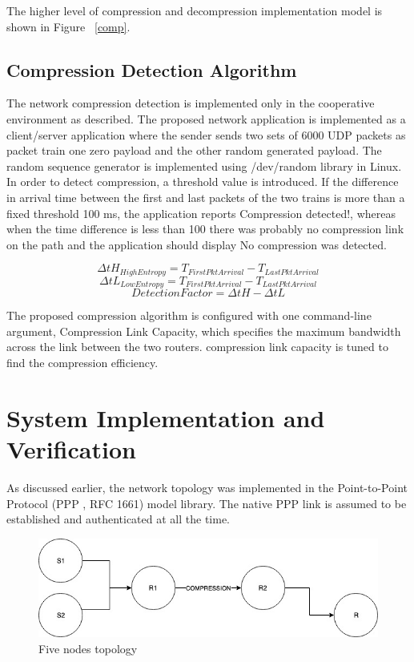 \documentclass[sigconf]{acmart}
\begin{document}
The higher level of compression and decompression implementation model is shown in Figure ~\ref{comp}.
\subsection{Compression Detection Algorithm}
The network compression detection is implemented only in the cooperative environment as described. The proposed network application is implemented as a client/server application where the sender sends two sets of 6000 UDP packets as packet train one zero payload and the other random generated payload. The random sequence generator is implemented using /dev/random library in Linux. In order to detect compression, a threshold value is introduced. If the difference in arrival time between the first and last packets of the two trains is more than a fixed threshold 100 ms, the application reports Compression detected!, whereas when the time difference is less than 100 there was probably no compression link on the path and the application should display No compression was detected. 

\begin{displaymath}
	\Delta tH_{HighEntropy}  = T_{FirstPktArrival} - T_{LastPktArrival} 
\end{displaymath}
\begin{displaymath}
	\Delta tL_{LowEntropy}  = T_{FirstPktArrival} - T_{LastPktArrival} 
\end{displaymath}
\begin{equation}
 	DetectionFactor = \Delta tH - \Delta tL
\end{equation}
\label{delta}


The proposed compression algorithm is configured with one command-line argument, Compression Link Capacity, which specifies the maximum bandwidth across the link between the two routers. compression link capacity is tuned to find the compression efficiency.

\section{System Implementation and Verification}
As discussed earlier, the network topology was implemented in the Point-to-Point Protocol (PPP , RFC 1661) \cite{point1991autonet} model library. The native PPP link is assumed to be established and authenticated at all the time. 
\begin{figure}[h]
  \centering
  \includegraphics[width=\linewidth]{topoImp}
  \caption{Five nodes topology}
  \label{topoImp}
\end{figure}
\end{document}

